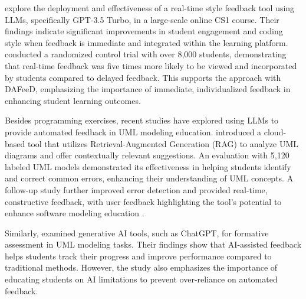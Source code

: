 \documentclass[sigconf,screen,review,anonymous]{acmart}
\begin{document}
\citet{woodrow:2024:AITeachesArt} explore the deployment and effectiveness of a real-time style feedback tool using LLMs, specifically GPT-3.5 Turbo, in a large-scale online CS1 course.
Their findings indicate significant improvements in student engagement and coding style when feedback is immediate and integrated within the learning platform.
\citeauthor{woodrow:2024:AITeachesArt} conducted a randomized control trial with over 8,000 students, demonstrating that real-time feedback was five times more likely to be viewed and incorporated by students compared to delayed feedback.
This supports the approach with DAFeeD, emphasizing the importance of immediate, individualized feedback in enhancing student learning outcomes.

Besides programming exercises, recent studies have explored using LLMs to provide automated feedback in UML modeling education.
\citet{ardimento:2024:TeachingUMLUsinga} introduced a cloud-based tool that utilizes Retrieval-Augmented Generation (RAG) to analyze UML diagrams and offer contextually relevant suggestions.
An evaluation with 5,120 labeled UML models demonstrated its effectiveness in helping students identify and correct common errors, enhancing their understanding of UML concepts.
A follow-up study further improved error detection and provided real-time, constructive feedback, with user feedback highlighting the tool's potential to enhance software modeling education \cite{ardimento:2024:RAGbasedFeedbackTool}.

Similarly, \citet{camara:2023:AssessmentGenerativeAI} examined generative AI tools, such as ChatGPT, for formative assessment in UML modeling tasks.
Their findings show that AI-assisted feedback helps students track their progress and improve performance compared to traditional methods.
However, the study also emphasizes the importance of educating students on AI limitations to prevent over-reliance on automated feedback.
\end{document}
